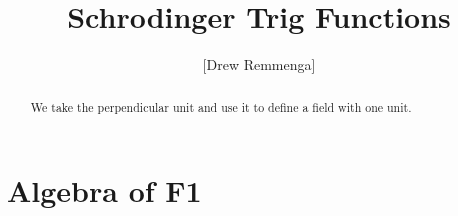 \documentclass[10pt, oneside]{article}
\title{Schrodinger Trig Functions}
\author{[Drew Remmenga]}
\begin{document}
\maketitle
\begin{abstract}
    We take the perpendicular unit and use it to define a field with one unit. 
\end{abstract}
\section{Algebra of F1}
    
\end{document}
